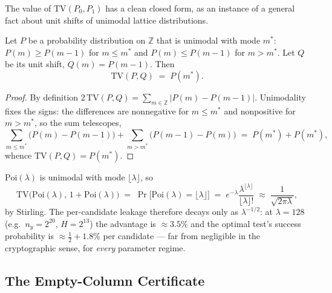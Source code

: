 \documentclass[runningheads]{llncs}
\newcommand{\Z}{\mathbb{Z}}
\newcommand{\half}{H}                        %
\newcommand{\Poi}{\mathrm{Poi}}
\newcommand{\TV}{\mathrm{TV}}
\begin{document}
The value of $\TV(P_0,P_1)$ has a clean closed form, as an instance of a general fact
about unit shifts of unimodal lattice distributions.

\begin{lemma}[$\TV$ of a unit shift $=$ mode mass]\label{lem:tvmode}
Let $P$ be a probability distribution on $\Z$ that is unimodal with mode $m^\ast$:
$P(m)\ge P(m-1)$ for $m\le m^\ast$ and $P(m)\le P(m-1)$ for $m>m^\ast$. Let $Q$ be
its unit shift, $Q(m)=P(m-1)$. Then
\[
  \TV(P,Q)\;=\;P(m^\ast).
\]
\end{lemma}

\begin{proof}
By definition $2\,\TV(P,Q)=\sum_{m\in\Z}\lvert P(m)-P(m-1)\rvert$. Unimodality fixes
the signs: the differences are nonnegative for $m\le m^\ast$ and nonpositive for
$m>m^\ast$, so the sum telescopes,
\[
  \sum_{m\le m^\ast}\big(P(m)-P(m-1)\big)
  +\sum_{m>m^\ast}\big(P(m-1)-P(m)\big)
  \;=\;P(m^\ast)+P(m^\ast),
\]
whence $\TV(P,Q)=P(m^\ast)$.
\end{proof}

\begin{corollary}\label{cor:advantage}
$\Poi(\lambda)$ is unimodal with mode $\lfloor\lambda\rfloor$, so
\[
  \TV\big(\Poi(\lambda),\,1+\Poi(\lambda)\big)
  \;=\;\Pr\big[\Poi(\lambda)=\lfloor\lambda\rfloor\big]
  \;=\;e^{-\lambda}\frac{\lambda^{\lfloor\lambda\rfloor}}{\lfloor\lambda\rfloor!}
  \;\approx\;\frac{1}{\sqrt{2\pi\lambda}},
\]
by Stirling. The per-candidate leakage therefore decays only as
$\lambda^{-1/2}$: at $\lambda=128$ (e.g.\ $n_y=2^{20}$, $\half=2^{13}$) the advantage
is $\approx3.5\%$ and the optimal test's success probability is
$\approx\tfrac12+1.8\%$ per candidate --- far from negligible in the cryptographic
sense, for \emph{every} parameter regime.
\end{corollary}

\subsection{The Empty-Column Certificate}
\label{sec:leak:certificate}
\end{document}
